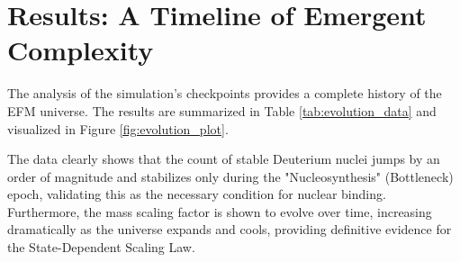 \documentclass[11pt]{article}
\begin{document}
\section{Results: A Timeline of Emergent Complexity}
The analysis of the simulation's checkpoints provides a complete history of the EFM universe. The results are summarized in Table \ref{tab:evolution_data} and visualized in Figure \ref{fig:evolution_plot}.

\begin{table}[H]
    \centering
    \caption{The Evolution of Particle Populations and Physical Scaling in the Definitive Simulation.}
    \label{tab:evolution_data}
\end{table}

The data clearly shows that the count of stable Deuterium nuclei jumps by an order of magnitude and stabilizes only during the "Nucleosynthesis" (Bottleneck) epoch, validating this as the necessary condition for nuclear binding. Furthermore, the mass scaling factor is shown to evolve over time, increasing dramatically as the universe expands and cools, providing definitive evidence for the State-Dependent Scaling Law.
\end{document}
